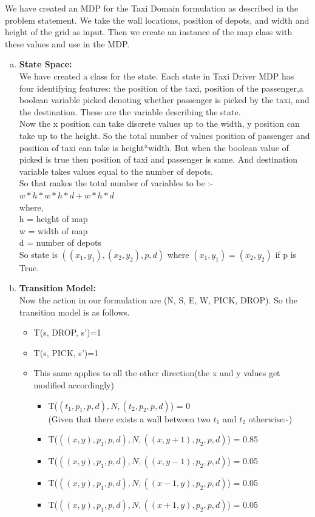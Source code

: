 \documentclass{article}
\begin{document}
We have created an MDP for the Taxi Domain formulation as described in the problem statement. We take the wall locations, position of depots, and width and height of the grid as input. Then we create an instance of the map class with these values and use in the MDP.
\begin{enumerate}[a)]
    \item
\textbf{State Space:\\}
We have created a class for the state. Each state in Taxi Driver MDP has four identifying features: the position of the taxi, position of the passenger,a boolean variable picked denoting whether passenger is picked by the taxi, and the destination. These are the variable describing the state.\\
Now the x position can take discrete values up to the width, y position can take up to the height. So the total number of values position of passenger and position of taxi can take is height*width. But when the boolean value of picked is true then position of taxi and passenger is same. And destination variable takes values equal to the number of depots. \\
So that makes the total number of variables to be :- \\
$w*h*w*h*d+w*h*d$\\ where,\\
h = height of map\\
w = width of map\\
d = number of depots\\
So state is $((x_1,y_1),(x_2,y_2),p,d)$ where $(x_1,y_1) = (x_2,y_2)$ if p is True.

\pagebreak

\item
\textbf{Transition Model: \\}Now the action in our formulation are (N, S, E, W, PICK, DROP). So the transition model is as follows.
\begin{itemize}
    \item T(s, DROP, s')=1
    \item T(s, PICK, s')=1
    \item This same applies to all the other direction(the x and y values get modified accordingly)
    \begin{itemize}
        \item T($(t_1,p_1,p,d),N,(t_2,p_2,p,d)$) = 0\\
        (Given that there exists a wall between two $t_1$ and $t_2$ otherwise:-)  
        \item T($((x,y),p_1,p,d),N,((x,y+1),p_2,p,d)$) = 0.85
        \item T($((x,y),p_1,p,d),N,((x,y-1),p_2,p,d)$) = 0.05
        \item T($((x,y),p_1,p,d),N,((x-1,y),p_2,p,d)$) = 0.05
        \item T($((x,y),p_1,p,d),N,((x+1,y),p_2,p,d)$) = 0.05
    \end{itemize}


\end{itemize}
\end{enumerate}
\end{document}
